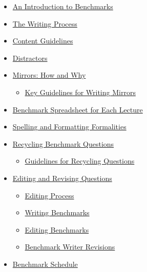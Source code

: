 \documentclass[
]{article}
\providecommand{\tightlist}{%
  \setlength{\itemsep}{0pt}\setlength{\parskip}{0pt}}
\begin{document}
\begin{itemize}
\tightlist
\item
  \protect\hyperlink{an-introduction-to-benchmarks}{An Introduction to Benchmarks}\\
\item
  \protect\hyperlink{the-writing-process}{The Writing Process}
\item
  \protect\hyperlink{content-guidelines}{Content Guidelines}\\
\item
  \protect\hyperlink{distractors}{Distractors}\\
\item
  \protect\hyperlink{mirrors-how-and-why}{Mirrors: How and Why}

  \begin{itemize}
  \tightlist
  \item
    \protect\hyperlink{key-guidelines-for-writing-mirrors}{Key Guidelines for Writing Mirrors}\\
  \end{itemize}
\item
  \protect\hyperlink{benchmark-spreadsheet-for-each-lecture}{Benchmark Spreadsheet for Each Lecture}\\
\item
  \protect\hyperlink{spelling-and-formatting-formalities}{Spelling and Formatting Formalities}\\
\item
  \protect\hyperlink{recycling-benchmark-questions}{Recycling Benchmark Questions}

  \begin{itemize}
  \tightlist
  \item
    \protect\hyperlink{guidelines-for-recycling-questions}{Guidelines for Recycling Questions}\\
  \end{itemize}
\item
  \protect\hyperlink{editing-and-revising-questions}{Editing and Revising Questions}

  \begin{itemize}
  \tightlist
  \item
    \protect\hyperlink{editing-process}{Editing Process}\\
  \item
    \protect\hyperlink{writing-benchmarks}{Writing Benchmarks}\\
  \item
    \protect\hyperlink{editing-benchmarks}{Editing Benchmarks}\\
  \item
    \protect\hyperlink{benchmark-writer-revisions}{Benchmark Writer Revisions}\\
  \end{itemize}
\item
  \protect\hyperlink{benchmark-schedule}{Benchmark Schedule}
\end{itemize}
\end{document}
